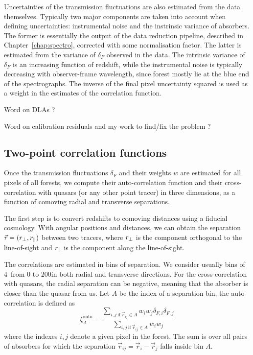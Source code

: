 Uncertainties of the transmission fluctuations are also estimated from the data 
themselves. Typically two major components are taken into account when defining 
uncertainties: instrumental noise and the instrinsic variance of absorbers.
The former is essentially the output of the data reduction pipeline, described 
in Chapter~\ref{chap:spectro}, corrected with some normalisation factor. 
The latter is estimated from the variance of $\delta_F$ observed in the data. 
The intrinsic variance of $\delta_F$ is an increasing function of redshift, 
while the instrumental noise is typically decreasing with observer-frame wavelength, 
since forest mostly lie at the blue end of the spectrographs. 
The inverse of the final pixel uncertainty squared is used as a weight in the estimates of 
the correlation function.  

Word on DLAs ? 

Word on calibration residuals and my work to find/fix the problem ? 

\subsection{Two-point correlation functions}
\label{forests:bao:correlations}

Once the transmission fluctuations $\delta_F$ and their weights $w$ are estimated
for all pixels of all forests, we compute their auto-correlation function and 
their cross-correlation with quasars (or any other point tracer) in three dimensions, 
as a function of comoving radial and transverse separations. 

The first step is to convert redshifts to comoving distances using a fiducial cosmology. 
With angular positions and distances, we can obtain the separation $\vec{r} = ({r_\perp}, {r_\parallel})$
between two tracers, where ${r_\perp}$ is the component orthogonal to the line-of-sight and 
${r_\parallel}$ is the component along the line-of-sight. 

The correlations are estimated in bins of separation. We consider usually bins of 4\hmpc\ 
from 0 to 200\hmpc in both radial and transverse directions. For the cross-correlation 
with quasars, the radial separation can be negative, meaning that the absorber is closer 
than the quasar from us. Let $A$ be the index of a separation bin, the auto-correlation is 
defined as 
\begin{equation}
\xi^\mathrm{auto}_A = \frac{\sum_{i, j ~ \mathrm{if} ~ \vec{r}_{ij} \in A} w_i w_j \delta_{F, i} \delta_{F, j}}{\sum_{i, j ~ \mathrm{if} ~ \vec{r}_{ij} \in A} w_i w_j}
\label{eq:autocorrelation} 
\end{equation}
where the indexes $i, j$ denote a given pixel in the forest. The sum is over all pairs of 
absorbers for which the separation $\vec{r}_{ij} = \vec{r}_i - \vec{r}_j$ falls inside bin $A$. 


